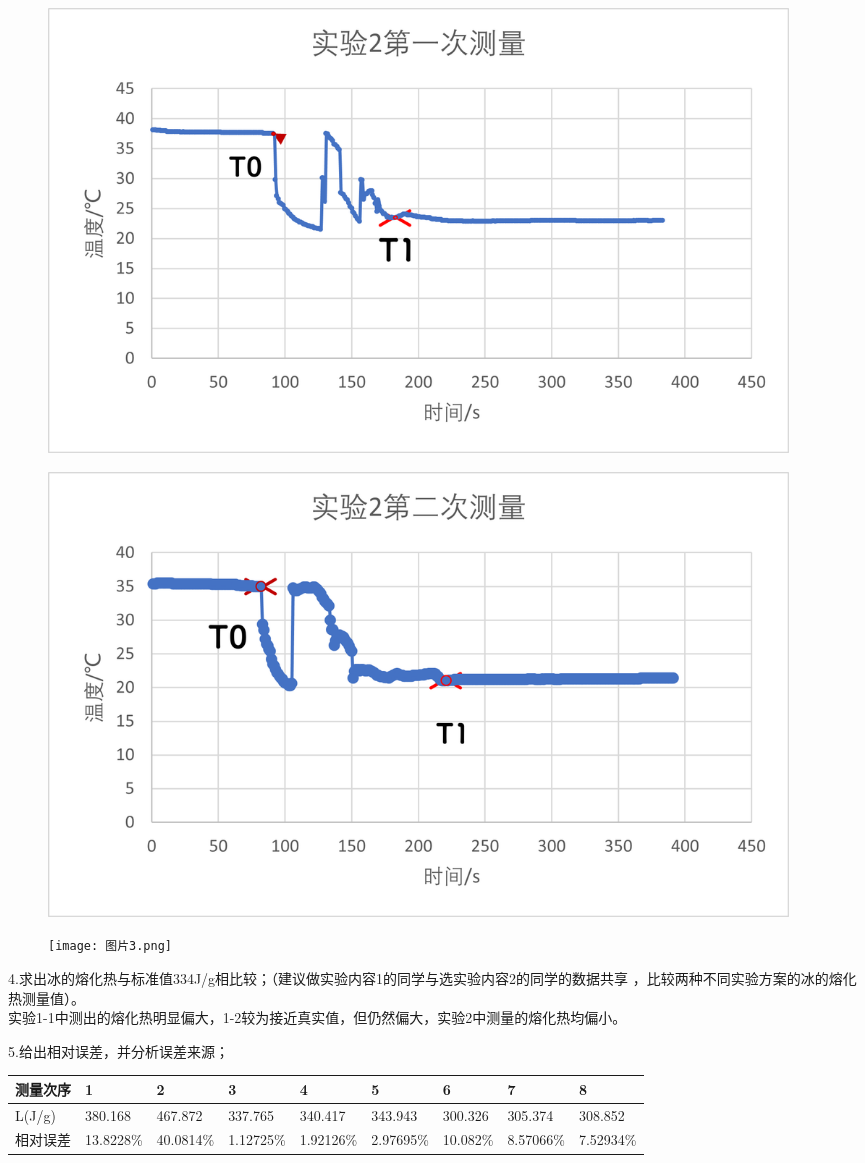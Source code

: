 \documentclass[dvipsnames, svgnames,a4paper,11pt]{article}
\begin{document}
\begin{figure}[htbp]
	\includegraphics[width=0.95\textwidth]{图片1.png}
\end{figure}
\begin{figure}[htbp]
	\includegraphics[width=0.95\textwidth]{图片2.png}
\end{figure}
\begin{figure}[!h]
	\texttt{[image: 图片3.png]}
\end{figure}\newpage
4.求出冰的熔化热与标准值334J/g相比较；（建议做实验内容1的同学与选实验内容2的同学的数据共享
，比较两种不同实验方案的冰的熔化热测量值）。\\
实验1-1中测出的熔化热明显偏大，1-2较为接近真实值，但仍然偏大，实验2中测量的熔化热均偏小。\par
\vspace{1cm}
5.给出相对误差，并分析误差来源；\\
\begin{table}[!h]
    \centering
    \begin{tabular}{|l|l|l|l|l|l|l|l|l|}
    \hline
	测量次序&1&2&3&4&5&6&7&8\\
	\hline
	L(J/g)&380.168&467.872&337.765&340.417&343.943&300.326&305.374&308.852\\
	\hline
	相对误差&13.8228\%&40.0814\%&1.12725\%&1.92126\%&2.97695\%&10.082\%&8.57066\%&7.52934\%\\
	\hline
    \end{tabular}
\end{table}\\
\end{document}
